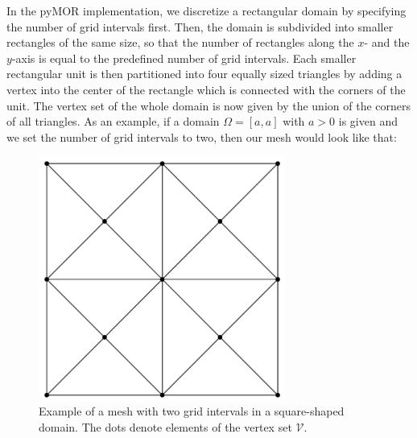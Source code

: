 In the pyMOR implementation, we discretize a rectangular domain by specifying the number of grid intervals first. Then, the domain is subdivided into smaller rectangles of the same size, so that the number of rectangles along the $x$- and the $y$-axis is equal to the predefined number of grid intervals. Each smaller rectangular unit is then partitioned into four equally sized triangles by adding a vertex into the center of the rectangle which is connected with the corners of the unit. The vertex set of the whole domain is now given by the union of the corners of all triangles. As an example, if a domain $\Omega = [a, a]$ with $a>0$ is given and we set the number of grid intervals to two, then our mesh would look like that:
\begin{figure}
    \centering
    \includegraphics[height=8cm]{mesh.png} 
    \caption{Example of a mesh with two grid intervals in a square-shaped domain. The dots denote elements of the vertex set $\mathcal{V}$.}
\end{figure}

